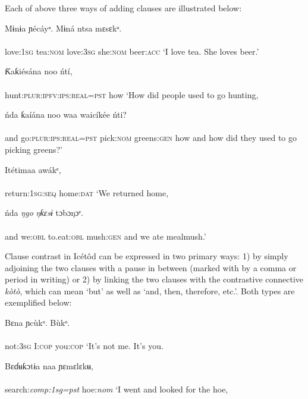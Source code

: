 Each of above three ways of adding clauses are illustrated below:




\ea\label{ex:}
\gll Mɨnɨa     ɲécáyᵃ.   Mɨná       ntsa   mɛsɛkᵃ. \\
    \\
love:\textsc{1sg}   tea:\textsc{nom}   love:\textsc{3sg} she:\textsc{nom}   beer:\textsc{acc}
\glt ‘I love tea. She loves beer.’ 
\z




\ea\label{ex:}
\gll Ƙaƙiésána noo       ńtí, \\
    \\
hunt:\textsc{plur:ipfv:ips:real=pst}   how
\glt ‘How did people used to go hunting, 
\z



\ea\label{ex:}
\gll ńda   ƙaíána noo         waa   waicíkée     ńti? \\
    \\
and   go:\textsc{plur:ips:real=pst} pick:\textsc{nom} greens:\textsc{gen} how
\glt and how did they used to go picking greens?’
\z  



\ea\label{ex:}
\gll Itétimaa awákᵉ, \\
    \\
return:\textsc{1sg:seq} home:\textsc{dat} 
\glt ‘We returned home, 
\z



\ea\label{ex:}
\gll ńda\textit{}  \textit{ŋgo}\textit{}     \textit{ŋƙɛsɨ}\textit{}     tɔbɔŋɔᵉ. \\
    \\
and   we:\textsc{obl}   to.eat:\textsc{obl}   mush:\textsc{gen}
\glt and we ate mealmush.’
\z  

Clause contrast in Icétôd can be expressed in two primary ways: 1) by simply adjoining the two clauses with a pause in between (marked with by a comma or period in writing) or 2) by linking the two clauses with the contrastive connective \textit{kòtò}, which can mean ‘but’ as well as ‘and, then, therefore, etc.’. Both types are exemplified below:



\ea\label{ex:}
\gll Bɛna     ɲcùkᵒ.     Bùkᵒ. \\
    \\
not:\textsc{3sg}   I:\textsc{cop}     you:\textsc{cop}
\glt ‘It’s not me. It’s you. 
\z




\ea\label{ex:}
\gll Bɛɗʉƙɔtɨa naa     ɲɛmɛlɛkʉ, \\
    \\
search:\textit{comp:1sg=pst}   hoe:\textit{nom}
\glt ‘I went and looked for the hoe, 
\z



